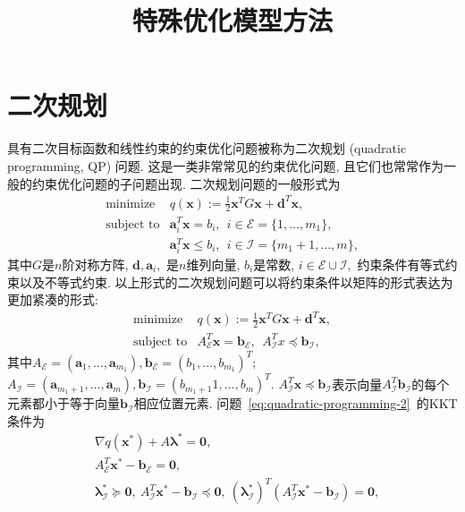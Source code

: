 \documentclass{SBCbookchapter}
\author{}
\title{特殊优化模型方法}
\newcommand{\V}[1]{{\bm{#1}}}
\numberwithin{equation}{section}
\begin{document}
\maketitle


\section{二次规划}
\label{sec:7.2}


具有二次目标函数和线性约束的约束优化问题被称为二次规划 (quadratic programming, QP) 问题. 这是一类非常常见的约束优化问题, 且它们也常常作为一般的约束优化问题的子问题出现. 二次规划问题的一般形式为
\begin{equation}
\label{eq:quadratic-programming-1}
\begin{array}{cl}
\text{minimize} & q(\V{x}) := \frac{1}{2} \V{x}^T G \V{x} + \V{d}^T \V{x}, \\
\text{subject to} & \V{a}_i^T \V{x} = b_i, ~~ i \in \mathcal{E} = \{1, \ldots, m_1\}, \\
& \V{a}_i^T \V{x} \leqslant b_i, ~~ i \in \mathcal{I} = \{m_1 + 1, \ldots, m\},
\end{array}
\end{equation}
其中$G$是$n$阶对称方阵, $\V{d}, \V{a}_i,$ 是$n$维列向量, $b_i$是常数, $i \in \mathcal{E} \cup \mathcal{I},$ 约束条件有等式约束以及不等式约束. 以上形式的二次规划问题可以将约束条件以矩阵的形式表达为更加紧凑的形式:
\begin{equation}
\label{eq:quadratic-programming-2}
\begin{array}{cl}
\text{minimize} & q(\V{x}) := \frac{1}{2} \V{x}^T G \V{x} + \V{d}^T \V{x}, \\
\text{subject to} & A^T_{\mathcal{E}} \V{x} = \V{b}_{\mathcal{E}}, ~~ A^T_{\mathcal{I}} x \preccurlyeq \V{b}_{\mathcal{I}},
\end{array}
\end{equation}
其中$A_{\mathcal{E}} = (\V{a}_1, \ldots, \V{a}_{m_1}), \V{b}_{\mathcal{E}} = (b_1, \ldots, b_{m_1})^T;$ $A_{\mathcal{I}} = (\V{a}_{m_1+1}, \ldots, \V{a}_m), \V{b}_{\mathcal{I}} = (b_{m_1+1}1, \ldots, b_m)^T.$ $A^T_{\mathcal{I}} \V{x} \preccurlyeq \V{b}_{\mathcal{I}}$表示向量$A^T_{\mathcal{I}} \V{b}_{\mathcal{I}}$的每个元素都小于等于向量$\V{b}_{\mathcal{I}}$相应位置元素. 问题~\eqref{eq:quadratic-programming-2}~的KKT条件为
\begin{equation}
\label{eq:quadratic-programming-kkt}
\begin{aligned}
& \nabla q(\V{x}^*) + A \V{\lambda}^* = \V{0}, \\
& A^T_{\mathcal{E}} \V{x}^* - \V{b}_{\mathcal{E}} = \V{0}, \\
& \V{\lambda}^*_{\mathcal{I}} \succcurlyeq \V{0}, ~ A_{\mathcal{I}}^T \V{x}^* - \V{b}_{\mathcal{I}} \preccurlyeq \V{0}, ~ (\V{\lambda}^*_{\mathcal{I}})^T (A_{\mathcal{I}}^T \V{x}^* - \V{b}_{\mathcal{I}}) = \V{0},
\end{aligned}
\end{equation}
\end{document}
